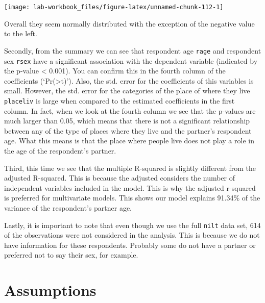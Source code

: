 \documentclass[
]{book}
\newenvironment{Shaded}{\begin{snugshade}}{\end{snugshade}}
\newcommand{\FunctionTok}[1]{\textcolor[rgb]{0.13,0.29,0.53}{\textbf{#1}}}
\newcommand{\NormalTok}[1]{#1}
\newcommand{\SpecialCharTok}[1]{\textcolor[rgb]{0.81,0.36,0.00}{\textbf{#1}}}
\begin{document}
\begin{Shaded}
\end{Shaded}

\begin{flushleft}\texttt{[image: lab-workbook\_files/figure-latex/unnamed-chunk-112-1]} \end{flushleft}

Overall they seem normally distributed with the exception of the negative value to the left.

Secondly, from the summary we can see that respondent age \texttt{rage} and respondent sex \texttt{rsex} have a significant association with the dependent variable (indicated by the p-value \textless{} 0.001). You can confirm this in the fourth column of the coefficients (`Pr(\textgreater\textbar t\textbar)'). Also, the std. error for the coefficients of this variables is small. However, the std. error for the categories of the place of where they live \texttt{placeliv} is large when compared to the estimated coefficients in the first column. In fact, when we look at the fourth column we see that the p-values are much larger than 0.05, which means that there is not a significant relationship between any of the type of places where they live and the partner's respondent age. What this means is that the place where people live does not play a role in the age of the respondent's partner.

Third, this time we see that the multiple R-squared is slightly different from the adjusted R-squared. This is because the adjusted considers the number of independent variables included in the model. This is why the adjusted r-squared is preferred for multivariate models. This shows our model explains 91.34\% of the variance of the respondent's partner age.

Lastly, it is important to note that even though we use the full \texttt{nilt} data set, 614 of the observations were not considered in the analysis. This is because we do not have information for these respondents. Probably some do not have a partner or preferred not to say their sex, for example.

\hypertarget{assumptions}{%
\section{Assumptions}\label{assumptions}}
\end{document}
